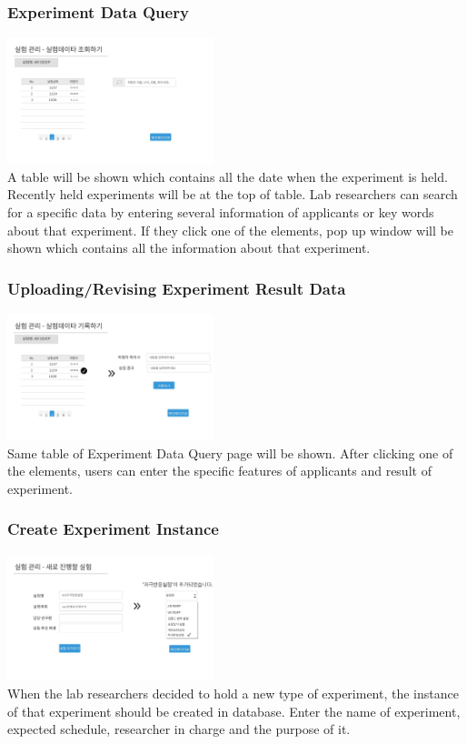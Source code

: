 \documentclass[letterpaper, 10 pt, conference]{ieeeconf}  %
\begin{document}
\subsubsection{Experiment Data Query}
\includegraphics[width=6cm]{Oven/09_reviewingData.jpg}
 \\A table will be shown which contains all the date when the experiment is held. Recently held experiments will be at the top of table. Lab researchers can search for a specific data by entering several information of applicants or key words about that experiment. If they click one of the elements, pop up window will be shown which contains all the information about that experiment. 

\subsubsection{Uploading/Revising Experiment Result Data}
\includegraphics[width=6cm]{Oven/08_recordingData.jpg}
\\Same table of Experiment Data Query page will be shown. After clicking one of the elements, users can enter the specific features of applicants and result of experiment. 

\subsubsection{Create Experiment Instance}
\includegraphics[width=6cm]{Oven/07_addNewExperiment.jpg}
\\When the lab researchers decided to hold a new type of experiment, the instance of that experiment should be created in database. Enter the name of experiment, expected schedule, researcher in charge and the purpose of it. 
\end{document}
